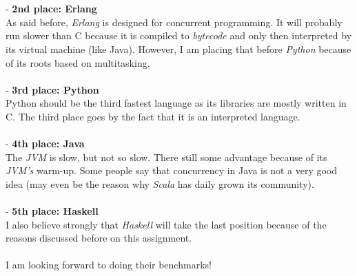 \documentclass[conference]{IEEEtran}
\begin{document}
\\\\
- \textbf{2nd place: Erlang}\\
As said before, \textit{Erlang} is designed for concurrent programming. It will probably run slower than C because it is compiled to \textit{bytecode} and only then interpreted by its virtual machine (like Java). However, I am placing that before \textit{Python} because of its roots based on multitasking.
\\\\
- \textbf{3rd place: Python}\\
Python should be the third fastest language as its libraries are mostly written in C. The third place goes by the fact that it is an interpreted language.
\\\\
- \textbf{4th place: Java}\\
The \textit{JVM} is slow, but not so slow. There still some advantage because of its \textit{JVM's} warm-up. Some people say that concurrency in Java is not a very good idea (may even be the reason why \textit{Scala} has daily grown its community).
\\\\
- \textbf{5th place: Haskell}\\
I also believe strongly that \textit{Haskell} will take the last position because of the reasons discussed before on this assignment.
\\\\
I am looking forward to doing their benchmarks!
\end{document}
